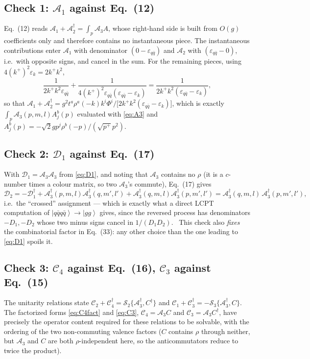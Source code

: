 \documentclass[11pt]{article}
\newcommand{\eps}{\varepsilon}
\newcommand{\dg}{\dagger}
\newcommand{\ket}[1]{\left|#1\right\rangle}
\newcommand{\Ph}{\Phi}
\begin{document}
\subsection{Check 1: $\mathcal A_1$ against Eq.~(12)}
Eq.~(12) reads $\mathcal A_1+\mathcal A_2^{\dg}=\int_{p}\mathcal A_{3}A$, whose right-hand side
is built from $O(g)$ coefficients only and therefore contains no instantaneous piece. The
instantaneous contributions enter $\mathcal A_1$ with denominator $(0-\eps_{q\bar q})$ and
$\mathcal A_2$ with $(\eps_{q\bar q}-0)$, i.e.\ with opposite signs, and cancel in the sum. For
the remaining pieces, using $4(k^{+})^{2}\eps_{k}=2k^{+}k^{2}$,
\begin{equation}
\frac{1}{2k^{+}k^{2}\eps_{q\bar q}}+\frac{1}{4(k^{+})^{2}\eps_{q\bar q}(\eps_{q\bar q}-\eps_{k})}
=\frac{1}{2k^{+}k^{2}(\eps_{q\bar q}-\eps_{k})},
\end{equation}
so that $\mathcal A_1+\mathcal A_2^{\dg}
=g^{2}t^{a}\rho^{a}(-k)k^{i}\Ph^{i}/\big[2k^{+}k^{2}(\eps_{q\bar q}-\eps_{k})\big]$, which is
exactly $\int_{p}\mathcal A_{3}(p,m,l)A^{b}_{j}(p)$ evaluated with \eqref{eq:A3} and
$A^{b}_{j}(p)=-\sqrt2 g p^{j}\rho^{b}(-p)/(\sqrt{p^{+}}p^{2})$. \checkmark

\subsection{Check 2: $\mathcal D_1$ against Eq.~(17)}
With $\mathcal D_{1}=\mathcal A_{3}\mathcal A_{3}$ from \eqref{eq:D1}, and noting that
$\mathcal A_{3}$ contains no $\rho$ (it is a $c$-number times a colour matrix, so two
$\mathcal A_3$'s commute), Eq.~(17) gives
\begin{equation}
\mathcal D_{2}=-\mathcal D_{1}^{\dg}
+\mathcal A_{3}^{\dg}(p,m,l)\mathcal A_{3}^{\dg}(q,m',l')
+\mathcal A_{3}^{\dg}(q,m,l)\mathcal A_{3}^{\dg}(p,m',l')
=\mathcal A_{3}^{\dg}(q,m,l)\,\mathcal A_{3}^{\dg}(p,m',l'),
\end{equation}
i.e.\ the ``crossed'' assignment --- which is exactly what a direct LCPT computation of
$\ket{q\bar q q\bar q}\to\ket{gg}$ gives, since the reversed process has denominators
$-D_{1},-D_{2}$ whose two minus signs cancel in $1/(D_1D_2)$. \checkmark\ This check also
\emph{fixes} the combinatorial factor in Eq.~(33): any other choice than the one leading to
\eqref{eq:D1} spoils it.

\subsection{Check 3: $\mathcal C_4$ against Eq.~(16), $\mathcal C_3$ against Eq.~(15)}
The unitarity relations state $\mathcal C_{2}+\mathcal C_{4}^{\dg}
=\mathcal S_{2}\{\mathcal A_{3}^{\dg},C^{\dg}\}$ and
$\mathcal C_{1}+\mathcal C_{3}^{\dg}=-\mathcal S_{3}\{\mathcal A_{3}^{\dg},C\}$. The factorized
forms \eqref{eq:C4fact} and \eqref{eq:C3}, $\mathcal C_{4}=\mathcal A_{3}C$ and
$\mathcal C_{3}=\mathcal A_{3}C^{\dg}$, have precisely the operator content required for these
relations to be solvable, with the ordering of the two non-commuting valence factors
($C$ contains $\rho$ through neither, but $\mathcal A_3$ and $C$ are both $\rho$-independent
here, so the anticommutators reduce to twice the product). \checkmark
\end{document}
